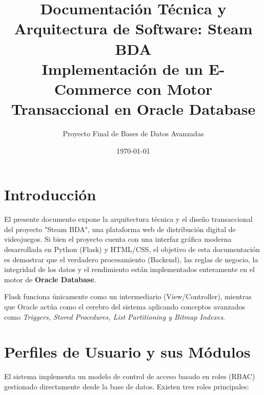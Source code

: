 \documentclass[12pt,a4paper]{article}
\title{\textbf{Documentación Técnica y Arquitectura de Software: Steam BDA} \\ \Large{Implementación de un E-Commerce con Motor Transaccional en Oracle Database}}
\author{Proyecto Final de Bases de Datos Avanzadas}
\date{\today}
\begin{document}
\maketitle
\tableofcontents
\newpage

\section{Introducción}
El presente documento expone la arquitectura técnica y el diseño transaccional del proyecto "Steam BDA", una plataforma web de distribución digital de videojuegos. Si bien el proyecto cuenta con una interfaz gráfica moderna desarrollada en Python (Flask) y HTML/CSS, el objetivo de esta documentación es demostrar que el verdadero procesamiento (Backend), las reglas de negocio, la integridad de los datos y el rendimiento están implementados enteramente en el motor de \textbf{Oracle Database}.

Flask funciona únicamente como un intermediario (View/Controller), mientras que Oracle actúa como el cerebro del sistema aplicando conceptos avanzados como \textit{Triggers, Stored Procedures, List Partitioning y Bitmap Indexes}.

\section{Perfiles de Usuario y sus Módulos}
El sistema implementa un modelo de control de acceso basado en roles (RBAC) gestionado directamente desde la base de datos. Existen tres roles principales:
\end{document}

